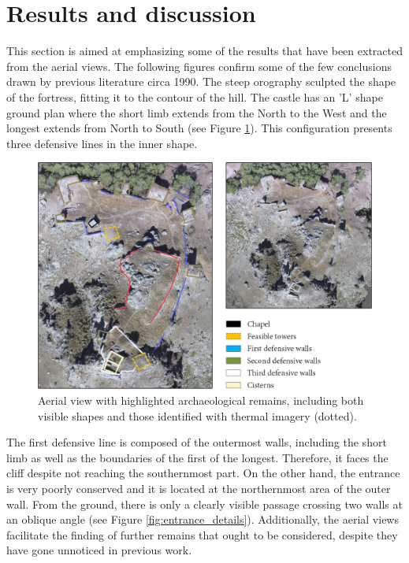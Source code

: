 
\section{Results and discussion}

This section is aimed at emphasizing some of the results that have been extracted from the aerial views. The following figures confirm some of the few conclusions drawn by previous literature circa 1990. The steep orography sculpted the shape of the fortress, fitting it to the contour of the hill. The castle has an 'L' shape ground plan where the short limb extends from the North to the West and the longest extends from North to South (see Figure \ref{fig:archaeological_remains_structure}). This configuration presents three defensive lines in the inner shape. 

\begin{figure}[htbp]
    \centering
    \includegraphics[width=\linewidth]{figs/castle_puerta_arenas/castle_annotations.png}
    \caption{Aerial view with highlighted archaeological remains, including both visible shapes and those identified with thermal imagery (dotted). }
    \label{fig:archaeological_remains_structure}
\end{figure}

The first defensive line is composed of the outermost walls, including the short limb as well as the boundaries of the first of the longest. Therefore, it faces the cliff despite not reaching the southernmost part. On the other hand, the entrance is very poorly conserved and it is located at the northernmost area of the outer wall. From the ground, there is only a clearly visible passage crossing two walls at an oblique angle (see Figure \ref{fig:entrance_details}). Additionally, the aerial views facilitate the finding of further remains that ought to be considered, despite they have gone unnoticed in previous work. 

